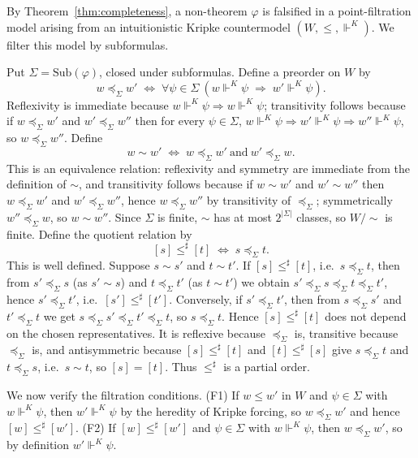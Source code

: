 \documentclass[final,12pt]{elsarticle}
\theoremstyle{plain}
\theoremstyle{definition}
\begin{document}
\proof
By Theorem~\ref{thm:completeness}, a non-theorem \(\varphi\) is falsified in a
point-filtration model arising from an intuitionistic Kripke countermodel
\((W,\le,\Vdash^{K})\). We filter this model by subformulas.

Put \(\Sigma = \mathrm{Sub}(\varphi)\), closed under subformulas.  Define a
preorder on \(W\) by
\[
  w \preceq_{\Sigma} w' \;\iff\;
  \forall \psi \in \Sigma \ (w \Vdash^{K} \psi \;\Rightarrow\; w' \Vdash^{K} \psi).
\]
Reflexivity is immediate because \(w \Vdash^{K} \psi \Rightarrow w \Vdash^{K}
\psi\); transitivity follows because if \(w \preceq_{\Sigma} w'\) and
\(w' \preceq_{\Sigma} w''\) then for every \(\psi \in \Sigma\),
\(w \Vdash^{K} \psi \Rightarrow w' \Vdash^{K} \psi \Rightarrow w'' \Vdash^{K}
\psi\), so \(w \preceq_{\Sigma} w''\).  Define
\[
  w \sim w' \;\iff\; w \preceq_{\Sigma} w' \ \text{and}\ w' \preceq_{\Sigma} w.
\]
This is an equivalence relation: reflexivity and symmetry are immediate from the
definition of \(\sim\), and transitivity follows because if \(w \sim w'\) and
\(w' \sim w''\) then \(w \preceq_{\Sigma} w'\) and \(w' \preceq_{\Sigma} w''\),
hence \(w \preceq_{\Sigma} w''\) by transitivity of \(\preceq_{\Sigma}\);
symmetrically \(w'' \preceq_{\Sigma} w\), so \(w \sim w''\).  Since
\(\Sigma\) is finite, \(\sim\) has at most \(2^{|\Sigma|}\) classes, so
\(W/{\sim}\) is finite.  Define the quotient relation by
\[
  [s] \le^{\sharp} [t] \;\iff\; s \preceq_{\Sigma} t.
\]
This is well defined.  Suppose \(s \sim s'\) and \(t \sim t'\).  If
\([s] \le^{\sharp} [t]\), i.e.\ \(s \preceq_{\Sigma} t\), then from
\(s' \preceq_{\Sigma} s\) (as \(s' \sim s\)) and \(t \preceq_{\Sigma} t'\)
(as \(t \sim t'\)) we obtain
\(s' \preceq_{\Sigma} s \preceq_{\Sigma} t \preceq_{\Sigma} t'\), hence
\(s' \preceq_{\Sigma} t'\), i.e.\ \([s'] \le^{\sharp} [t']\).  Conversely, if
\(s' \preceq_{\Sigma} t'\), then from \(s \preceq_{\Sigma} s'\) and
\(t' \preceq_{\Sigma} t\) we get
\(s \preceq_{\Sigma} s' \preceq_{\Sigma} t' \preceq_{\Sigma} t\), so
\(s \preceq_{\Sigma} t\).  Hence \([s] \le^{\sharp} [t]\) does not depend on the
chosen representatives.  It is reflexive because \(\preceq_{\Sigma}\) is,
transitive because \(\preceq_{\Sigma}\) is, and antisymmetric because
\([s] \le^{\sharp} [t]\) and \([t] \le^{\sharp} [s]\) give \(s \preceq_{\Sigma}
t\) and \(t \preceq_{\Sigma} s\), i.e.\ \(s \sim t\), so \([s] = [t]\).  Thus
\(\le^{\sharp}\) is a partial order.


We now verify the filtration conditions.  (F1) If \(w \le w'\) in \(W\) and
\(\psi \in \Sigma\) with \(w \Vdash^{K} \psi\), then \(w' \Vdash^{K} \psi\) by
the heredity of Kripke forcing, so \(w \preceq_{\Sigma} w'\) and hence
\([w] \le^{\sharp} [w']\).  (F2) If \([w] \le^{\sharp} [w']\) and \(\psi \in
\Sigma\) with \(w \Vdash^{K} \psi\), then \(w \preceq_{\Sigma} w'\), so by
definition \(w' \Vdash^{K} \psi\).
\end{document}
